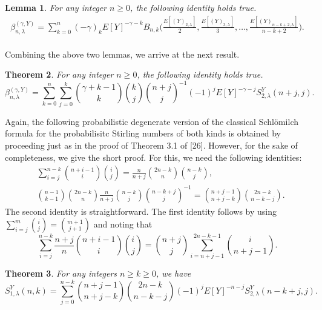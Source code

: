 \documentclass[a4paper,11pt]{amsart}
\newtheorem{theorem}{Theorem}[section]
\newtheorem{lemma}[theorem]{Lemma}
\begin{document}
\begin{lemma}
For any integer $n \ge 0$, the following identity holds true.
\begin{align*}
\beta_{n,\lambda}^{(\gamma,Y)}=\sum_{k=0}^{n}(-\gamma)_{k}E[Y]^{-\gamma-k} B_{n,k}\Big(\frac{E[(Y)_{2,\lambda}]}{2},\frac{E[(Y)_{3,\lambda}]}{3},\dots,\frac{E[(Y)_{n-k+2,\lambda}]}{n-k+2}\Big). \\
\end{align*}
\end{lemma}
Combining the above two lemmas, we arrive at the next result.
\begin{theorem}
For any integer $n \ge 0$, the following identity holds true.
\begin{equation*}
\beta_{n,\lambda}^{(\gamma,Y)}=\sum_{k=0}^{n}\sum_{j=0}^{k}\binom{\gamma+k-1}{k}\binom{k}{j}\binom{n+j}{j}^{-1}(-1)^{j}E[Y]^{-\gamma-j}S_{2,\lambda}^{Y}(n+j,j).
\end{equation*}
\end{theorem}
Again, the following probabilistic degenerate version of the classical Schl\"omilch formula for the probabilisitc Stirling numbers of both kinds is obtained by proceeding just as in the proof of Theorem 3.1 of [26]. However, for the sake of completeness, we give the short proof. For this, we need the following identities:
\begin{equation} \label{39}
\begin{aligned}
&\sum_{i=j}^{n-k}\binom{n+i-1}{i}\binom{i}{j}=\frac{n}{n+j}\binom{2n-k}{n}\binom{n-k}{j}, \\
&\binom{n-1}{k-1}\binom{2n-k}{n}\frac{n}{n+j}\binom{n-k}{j}\binom{n-k+j}{j}^{-1}=\binom{n+j-1}{n+j-k}\binom{2n-k}{n-k-j}.
\end{aligned}
\end{equation}
The second identity is straightforward. The first identity follows by using $\sum_{i=j}^{m}\binom{i}{j}=\binom{m+1}{j+1}$ and noting that
\begin{equation*}
\sum_{i=j}^{n-k}\frac{n+j}{n}\binom{n+i-1}{i}\binom{i}{j}=\binom{n+j}{j}\sum_{i=n+j-1}^{2n-k-1}\binom{i}{n+j-1}.
\end{equation*}
\begin{theorem}
For any integers $n \ge k \ge 0$, we have
\begin{equation*}
S_{1,\lambda}^{Y}(n,k)=\sum_{j=0}^{n-k}\binom{n+j-1}{n+j-k}\binom{2n-k}{n-k-j}(-1)^{j}E[Y]^{-n-j}S_{2,\lambda}^{Y}(n-k+j,j).
\end{equation*}
\end{theorem}
\end{document}
